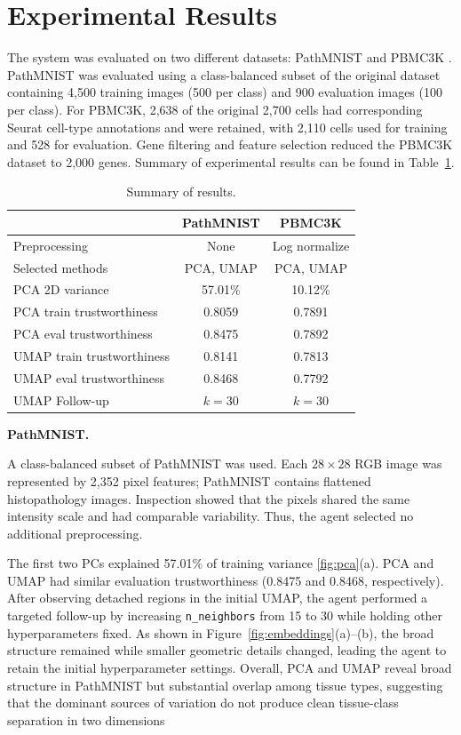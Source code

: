 \documentclass[10pt]{article}
\begin{document}
\section{Experimental Results}

The system was evaluated on two different datasets: PathMNIST \cite{yang2023medmnist} and PBMC3K \cite{pbmc3k}. PathMNIST was evaluated using a class-balanced subset of the original dataset containing 4,500 training images (500 per class) and 900 evaluation images (100 per class). For PBMC3K, 2,638 of the original 2,700 cells had corresponding Seurat cell-type annotations and were retained, with 2,110 cells used for training and 528 for evaluation. Gene filtering and feature selection reduced the PBMC3K dataset to 2,000 genes. Summary of experimental results can be found in Table~\ref{tab:results}.

\begin{table}[H]
    \centering
    \small
    \setlength{\tabcolsep}{4.5pt}
    \begin{tabular}{lcc}
        \toprule
        & \textbf{PathMNIST} & \textbf{PBMC3K} \\
        \midrule
        Preprocessing & None & Log normalize \\
        Selected methods & PCA, UMAP & PCA, UMAP \\
        PCA 2D variance & 57.01\% & 10.12\% \\
        PCA train trustworthiness  & 0.8059 & 0.7891 \\
        PCA eval trustworthiness  & 0.8475 & 0.7892 \\
        UMAP train trustworthiness & 0.8141 & 0.7813 \\
        UMAP eval trustworthiness & 0.8468 & 0.7792 \\
        UMAP Follow-up & $k=30$ & $k=30$ \\
        \bottomrule
    \end{tabular}
    \caption{Summary of results.}
    \label{tab:results}
\end{table}

\textbf{PathMNIST.}

A class-balanced subset of PathMNIST was used. Each $28\times28$ RGB image was represented by 2,352 pixel features; PathMNIST contains flattened histopathology images. Inspection showed that the pixels shared the same intensity scale and had comparable variability. Thus, the agent selected no additional preprocessing.

The first two PCs explained 57.01\% of training variance \ref{fig:pca}(a). PCA and UMAP had similar evaluation trustworthiness (0.8475 and 0.8468, respectively). After observing detached regions in the initial UMAP, the agent performed a targeted follow-up by increasing \texttt{n\_neighbors} from 15 to 30 while holding other hyperparameters fixed. As shown in Figure~\ref{fig:embeddings}(a)--(b), the broad structure remained while smaller geometric details changed, leading the agent to retain the initial hyperparameter settings. Overall, PCA and UMAP reveal broad structure in PathMNIST but substantial overlap among tissue types, suggesting that the dominant sources of variation do not produce clean tissue-class separation in two dimensions
\end{document}
